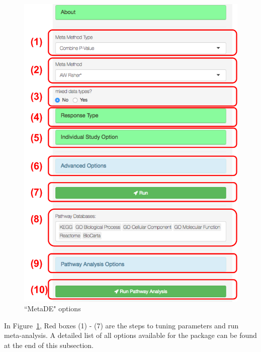 \begin{figure}[H]
\begin{center}
\includegraphics[scale=0.5]{./figure/metaDE/metaDEoption.pdf}
\caption{``MetaDE" options}
\label{fig:MetaDEoption}
\end{center}
\end{figure}

In Figure~\ref{fig:MetaDEoption},
{\color{red} Red boxes (1) - (7)} are the steps to tuning parameters and run meta-analysis.
A detailed list of all options available for the package can be found at the end of this subsection. 

